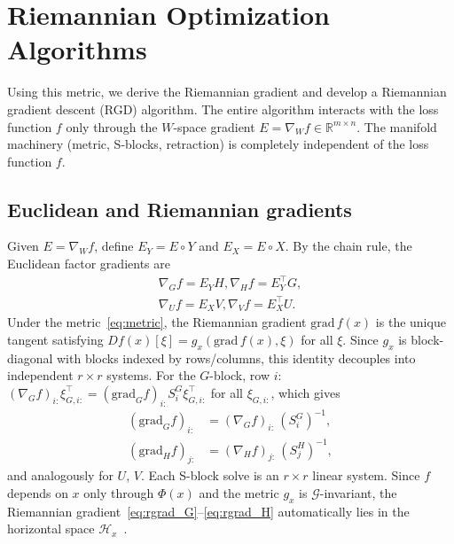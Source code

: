 \documentclass[letterpaper, 10 pt, conference]{ieeeconf}
\newcommand{\R}{\mathbb{R}}
\newcommand{\cG}{\mathcal{G}}
\newcommand{\cH}{\mathcal{H}}
\newcommand{\Had}{\circ}
\theoremstyle{plain}
\theoremstyle{definition}
\theoremstyle{remark}
\begin{document}
\section{Riemannian Optimization Algorithms}
\label{sec:algorithms}

Using this metric, we derive the Riemannian gradient and develop a Riemannian gradient descent (RGD) algorithm.
The entire algorithm interacts with the loss function $f$ only through the $W$-space gradient $E = \nabla_W f \in \R^{m\times n}$. The manifold machinery (metric, S-blocks, retraction) is completely independent of the loss function $f$.

\subsection{Euclidean and Riemannian gradients}

Given $E = \nabla_W f$, define $E_Y = E\Had Y$ and $E_X = E\Had X$. By the chain rule, the Euclidean factor gradients are
\begin{equation}
\begin{array}{ll}
  \nabla_G f = E_Y H, \nabla_H f = E_Y^\top G, \\
  \nabla_U f = E_X V, \nabla_V f = E_X^\top U.
  \end{array}
  \label{eq:egrad}
\end{equation}
Under the metric~\eqref{eq:metric}, the Riemannian gradient $\mathrm{grad}\,f(x)$ is the unique tangent satisfying $Df(x)[\xi] = g_x(\mathrm{grad}\,f(x),\xi)$ for all $\xi$.
Since $g_x$ is block-diagonal with blocks indexed by rows/columns, this identity decouples into independent $r\times r$ systems.
For the $G$-block, row $i$: $(\nabla_G f)_{i:}\xi_{G,i:}^\top = (\mathrm{grad}_G f)_{i:} S_i^G \xi_{G,i:}^\top$ for all $\xi_{G,i:}$, which gives
\begin{align}
  (\mathrm{grad}_G f)_{i:} &= (\nabla_G f)_{i:}\,(S_i^G)^{-1}, \label{eq:rgrad_G}\\
  (\mathrm{grad}_H f)_{j:} &= (\nabla_H f)_{j:}\,(S_j^H)^{-1}, \label{eq:rgrad_H}
\end{align}
and analogously for $U$, $V$.
Each S-block solve is an $r\times r$ linear system. Since $f$ depends on $x$ only through $\Phi(x)$ and the metric $g_x$ is $\cG$-invariant, the Riemannian gradient~\eqref{eq:rgrad_G}--\eqref{eq:rgrad_H} automatically lies in the horizontal space $\cH_x$~\cite{absilbook, boumal2023introduction}.
\end{document}
